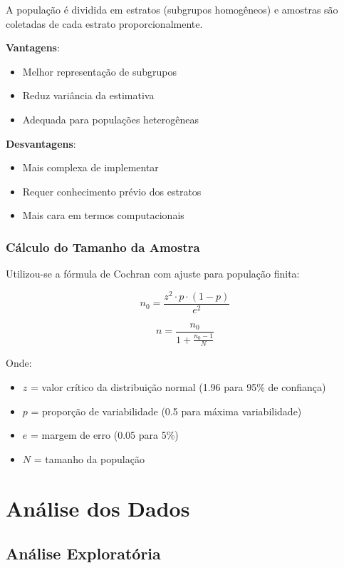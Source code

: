 \documentclass[12pt,a4paper]{article}
\begin{document}
A população é dividida em estratos (subgrupos homogêneos) e amostras são coletadas de cada estrato proporcionalmente.

\textbf{Vantagens}:
\begin{itemize}
    \item Melhor representação de subgrupos
    \item Reduz variância da estimativa
    \item Adequada para populações heterogêneas
\end{itemize}

\textbf{Desvantagens}:
\begin{itemize}
    \item Mais complexa de implementar
    \item Requer conhecimento prévio dos estratos
    \item Mais cara em termos computacionais
\end{itemize}

\subsubsection{Cálculo do Tamanho da Amostra}

Utilizou-se a fórmula de Cochran com ajuste para população finita:

$$n_0 = \frac{z^2 \cdot p \cdot (1-p)}{e^2}$$

$$n = \frac{n_0}{1 + \frac{n_0 - 1}{N}}$$

Onde:
\begin{itemize}
    \item $z$ = valor crítico da distribuição normal (1.96 para 95\% de confiança)
    \item $p$ = proporção de variabilidade (0.5 para máxima variabilidade)
    \item $e$ = margem de erro (0.05 para 5\%)
    \item $N$ = tamanho da população
\end{itemize}

\newpage

\section{Análise dos Dados}

\subsection{Análise Exploratória}
\end{document}

